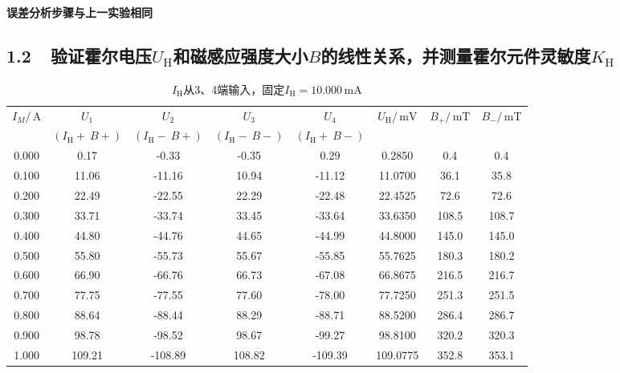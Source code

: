 \documentclass[a4paper,fontset=windows]{ctexart}
\begin{document}
    \textbf{误差分析步骤与上一实验相同}

    \newpage
    \subsection*{1.2\ \ 验证霍尔电压$U_\mathrm{H}$和磁感应强度大小$B$的线性关系，并测量霍尔元件灵敏度$K_\mathrm{H}$}

    \vspace{0.5em}
    \begin{table}[ht!]
        \begin{center}
            \caption*{$I_\mathrm{H}$从3、4端输入，固定$I_\mathrm{H} = 10.000\,\mathrm{mA}$}
            \begin{tabular}{ |c|c|c|c|c|c|c|c| }
                \hline
                \multirow{2}{*}{$I_M/\,\mathrm{A}$} & $U_1$ & $U_2$ & $U_3$ & $U_4$ & \multirow{2}{*}{$U_\mathrm{H}/\,\mathrm{mV}$} & \multirow{2}{*}{$B_+/\,\mathrm{mT}$} & \multirow{2}{*}{$B_-/\,\mathrm{mT}$} \\
                & $(I_\mathrm{H}+\ B+)$ & $(I_\mathrm{H}-\ B+)$ & $(I_\mathrm{H}-\ B-)$ & $(I_\mathrm{H}+\ B-)$ & & & \\
                \hline
                0.000 & 0.17 & -0.33 & -0.35 & 0.29 & 0.2850 & 0.4 & 0.4 \\
                \hline
                0.100 & 11.06 & -11.16 & 10.94 & -11.12 & 11.0700 & 36.1 & 35.8 \\
                \hline
                0.200 & 22.49 & -22.55 & 22.29 & -22.48 & 22.4525 & 72.6 & 72.6 \\
                \hline
                0.300 & 33.71 & -33.74 & 33.45 & -33.64 & 33.6350 & 108.5 & 108.7 \\
                \hline
                0.400 & 44.80 & -44.76 & 44.65 & -44.99 & 44.8000 & 145.0 & 145.0 \\
                \hline
                0.500 & 55.80 & -55.73 & 55.67 & -55.85 & 55.7625 & 180.3 & 180.2 \\
                \hline
                0.600 & 66.90 & -66.76 & 66.73 & -67.08 & 66.8675 & 216.5 & 216.7 \\
                \hline
                0.700 & 77.75 & -77.55 & 77.60 & -78.00 & 77.7250 & 251.3 & 251.5 \\
                \hline
                0.800 & 88.64 & -88.44 & 88.29 & -88.71 & 88.5200 & 286.4 & 286.7 \\
                \hline
                0.900 & 98.78 & -98.52 & 98.67 & -99.27 & 98.8100 & 320.2 & 320.3 \\
                \hline
                1.000 & 109.21 & -108.89 & 108.82 & -109.39 & 109.0775 & 352.8 & 353.1 \\
                \hline
            \end{tabular}
        \end{center}
    \end{table}
    \vspace{-0.5em}
\end{document}
